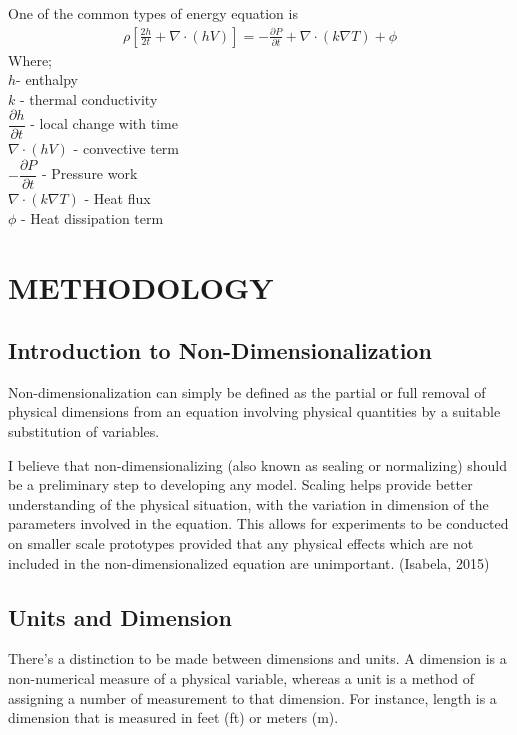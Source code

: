 \documentclass[11pt]{report}
\newcommand{\NI}{\noindent}
\begin{document}
	\NI One of the common types of energy equation is
	\begin{eqnarray*}
		\rho\left[\frac{2h}{2t} + \nabla \cdot (hV)\right] = - \frac{\partial P}{\partial t} + \nabla \cdot (k\nabla T) + \phi
	\end{eqnarray*}
	Where;\\
	\hspace*{1cm} $h$- enthalpy\\
	\hspace*{1cm} $k$ - thermal conductivity\\
	\hspace*{1cm} $\dfrac{\partial h}{\partial t}$ - local change with time \\
	\hspace*{1cm} $\nabla \cdot (hV)$ - convective term\\
	\hspace*{1cm} $-\dfrac{\partial P}{\partial t}$ - Pressure work\\
	\hspace*{1cm} $\nabla \cdot (k\nabla T)$ - Heat flux\\
	\hspace*{1cm} $\phi$ - Heat dissipation term\\
	
	
	
	\chapter{METHODOLOGY}
	\section{Introduction to Non-Dimensionalization}
	Non-dimensionalization can simply be defined as the partial or full removal of physical dimensions from an equation involving physical quantities by a suitable substitution of variables.
	
	\NI I believe that non-dimensionalizing (also known as sealing or normalizing) should be a preliminary step to developing any model. Scaling helps provide better understanding of the physical situation, with the variation in dimension of the parameters involved in the equation. This allows for experiments to be conducted on smaller scale prototypes provided that any physical effects which are not included in the non-dimensionalized equation are unimportant. (Isabela, 2015)
	
	\section{Units and Dimension}
	There's a distinction to be made between dimensions and units. A dimension is a non-numerical measure of a physical variable, whereas a unit is a method of assigning a number of measurement to that dimension. For instance, length is a dimension that is measured in feet (ft) or meters (m).
	
\end{document}
